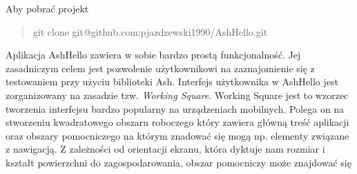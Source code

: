 \documentclass[brudnopis]{xmgr}
\begin{document}
Aby pobrać projekt 

\begin{quote}
   git clone git@github.com:pjazdzewski1990/AshHello.git
\end{quote}

Aplikacja AshHello zawiera w sobie bardzo prostą funkcjonalność. Jej zasadniczym celem jest pozwolenie użytkownikowi na zaznajomienie się z testowaniem przy użyciu biblioteki Ash. Interfejs użytkownika w AshHello jest zorganizowany na zasadzie tzw. {\it Working Square}. Working Square jest to wzorzec tworzenia interfejsu bardzo popularny na urządzeniach mobilnych. Polega on na stworzeniu kwadratowego obszaru roboczego który zawiera główną treść aplikacji oraz obszary pomocniczego na którym znadować się mogą np. elementy związane z nawigacją. Z zależności od orientacji ekranu, która dyktuje nam rozmiar i kształt powierzchni do zagospodarowania, obszar pomocniczy może znajdować się 
\end{document}
